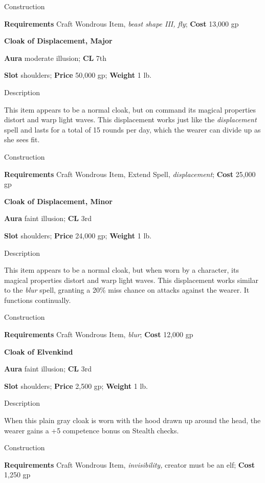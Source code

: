 Construction
				
\textbf{Requirements} Craft Wondrous Item, \textit{beast shape III, fly}; \textbf{Cost }13,000 gp
				
\textbf{Cloak of Displacement, Major}
				
\textbf{Aura} moderate illusion;\textbf{ CL }7th
				
\textbf{Slot} shoulders; \textbf{Price} 50,000 gp; \textbf{Weight} 1 lb.
				
Description
				
This item appears to be a normal cloak, but on command its magical properties distort and warp light waves. This displacement works just like the \textit{displacement }spell and lasts for a total of 15 rounds per day, which the wearer can divide up as she sees fit. 
				
Construction
				
\textbf{Requirements} Craft Wondrous Item, Extend Spell, \textit{displacement}; \textbf{Cost }25,000 gp
				
\textbf{Cloak of Displacement, Minor}
				
\textbf{Aura} faint illusion;\textbf{ CL }3rd
				
\textbf{Slot} shoulders; \textbf{Price} 24,000 gp; \textbf{Weight} 1 lb.
				
Description
				
This item appears to be a normal cloak, but when worn by a character, its magical properties distort and warp light waves. This displacement works similar to the \textit{blur }spell, granting a 20\% miss chance on attacks against the wearer. It functions continually. 
				
Construction
				
\textbf{Requirements} Craft Wondrous Item, \textit{blur}; \textbf{Cost }12,000 gp
				
\textbf{Cloak of Elvenkind}
				
\textbf{Aura} faint illusion;\textbf{ CL }3rd
				
\textbf{Slot} shoulders; \textbf{Price} 2,500 gp; \textbf{Weight} 1 lb.
				
Description
				
When this plain gray cloak is worn with the hood drawn up around the head, the wearer gains a +5 competence bonus on Stealth checks. 
				
Construction
				
\textbf{Requirements} Craft Wondrous Item, \textit{invisibility,} creator must be an elf; \textbf{Cost }1,250 gp
				
